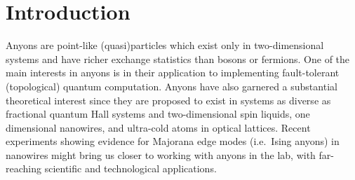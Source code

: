 \documentclass[aps,reprint,superscriptaddress,amsmath,amssymb,amsfonts,prb]{revtex4-1}
\begin{document}
\section{Introduction}
Anyons are point-like (quasi)particles which exist only in two-dimensional systems and have richer exchange statistics than bosons or fermions. One of the main interests in anyons is in their application to implementing fault-tolerant (topological) quantum computation.\citep{freedman2002,kitaev2003,Nayak2008} Anyons have also garnered a substantial theoretical interest since they are proposed to exist in systems as diverse as fractional quantum Hall systems and two-dimensional spin liquids,\citep{laughlin1983,halperin1984,fradkin1989,read1999,read2000,xia2004,Stern2007,Nayak2008,pan2008,stern2010,sanghun-an2011,clarke2013,mong2014,vaezi2014} one dimensional nanowires,\cite{kitaev2001,stanescu2013,klinovaja2014,Nadj-perge2014} and ultra-cold atoms in optical lattices.\cite{Pachos2012} Recent experiments showing evidence for Majorana edge modes (i.e.~Ising anyons) in nanowires\cite{Nadj-perge2014} might bring us closer to working with anyons in the lab, with far-reaching scientific and technological 
applications.
\end{document}
